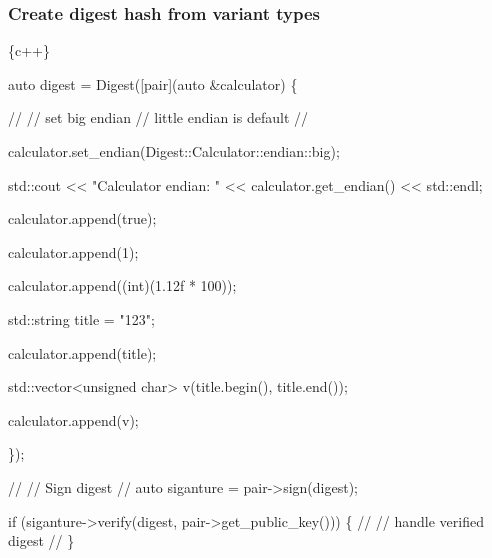 \subsubsection*{Create digest hash from variant types}


\begin{DoxyCode}
\{c++\}

auto digest = Digest([pair](auto &calculator) \{

        //
        // set big endian 
        // little endian is default
        //

        calculator.set\_endian(Digest::Calculator::endian::big);

        std::cout << "Calculator endian: " << calculator.get\_endian() << std::endl;

        calculator.append(true);

        calculator.append(1);

        calculator.append((int)(1.12f * 100));

        std::string title = "123";

        calculator.append(title);

        std::vector<unsigned char> v(title.begin(), title.end());

        calculator.append(v);

    \});

//
// Sign digest
//
auto siganture = pair->sign(digest);

if (siganture->verify(digest, pair->get\_public\_key())) \{
    //
    // handle verified digest
    //
\}
\end{DoxyCode}
 